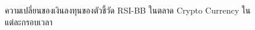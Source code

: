 \begin{figure}[!ht]
    \centering
    \caption{ความเปลี่ยนของเงินลงทุนของตัวชี้วัด RSI-BB ในตลาด Crypto Currency ในแต่ละกรอบเวลา}
    \label{fig:rsi-bb-crypto-all}
\end{figure}


